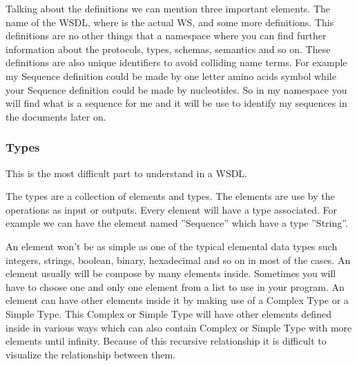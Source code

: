 \documentclass[a4paper,10pt]{article}
\begin{document}
    Talking about the definitions we can mention three important elements. The name of the WSDL, where is the actual WS, and some more definitions. This definitions are no other things that a namespace where you can find further information about the protocols, types, schemas, semantics and so on. These definitions are also unique identifiers to avoid colliding name terms. For example my Sequence definition could be made by one letter amino acids symbol while your Sequence definition could be made by nucleotides. So in my namespace you will find what is a sequence for me and it will be use to identify my sequences in the documents later on.\vspace{3 mm}

    \subsubsection{Types}

    This is the most difficult part to understand in a WSDL.\vspace{3 mm}

    The types are a collection of elements and types. The elements are use by the operations as input or outputs. Every element will have a type associated. For example we can have the element named ''Sequence'' which have a type ''String''. \vspace{3 mm}

    An element won't be as simple as one of the typical elemental data types such integers, strings, boolean, binary, hexadecimal and so on in most of the cases. An element usually will be compose by many elements inside. Sometimes you will have to choose one and only one element from a list to use in your program. An element can have other elements inside it by making use of a Complex Type or a Simple Type. This Complex or Simple Type will have other elements defined inside in various ways which can also contain Complex or Simple Type with more elements until infinity. Because of this recursive relationship it is difficult to visualize the relationship between them.\vspace{3 mm}
\end{document}
